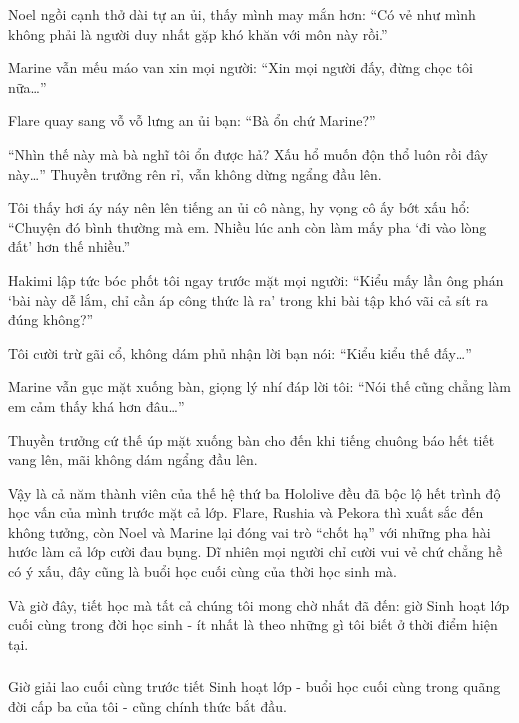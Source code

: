 \documentclass[../main.tex]{subfiles}
\begin{document}
Noel ngồi cạnh thở dài tự an ủi, thấy mình may mắn hơn: ``Có vẻ như mình không phải là người duy nhất gặp khó khăn với môn này rồi.''

Marine vẫn mếu máo van xin mọi người: ``Xin mọi người đấy, đừng chọc tôi nữa\dots''

Flare quay sang vỗ vỗ lưng an ủi bạn: ``Bà ổn chứ Marine?''

``Nhìn thế này mà bà nghĩ tôi ổn được hả? Xấu hổ muốn độn thổ luôn rồi đây này\dots'' Thuyền trưởng rên rỉ, vẫn không dừng ngẩng đầu lên.

Tôi thấy hơi áy náy nên lên tiếng an ủi cô nàng, hy vọng cô ấy bớt xấu hổ: ``Chuyện đó bình thường mà em. Nhiều lúc anh còn làm mấy pha `đi vào lòng đất' hơn thế nhiều.''

Hakimi lập tức bóc phốt tôi ngay trước mặt mọi người: ``Kiểu mấy lần ông phán `bài này dễ lắm, chỉ cần áp công thức là ra' trong khi bài tập khó vãi cả sít ra đúng không?''

Tôi cười trừ gãi cổ, không dám phủ nhận lời bạn nói: ``Kiểu kiểu thế đấy\dots''

Marine vẫn gục mặt xuống bàn, giọng lý nhí đáp lời tôi: ``Nói thế cũng chẳng làm em cảm thấy khá hơn đâu\dots''

Thuyền trưởng cứ thế úp mặt xuống bàn cho đến khi tiếng chuông báo hết tiết vang lên, mãi không dám ngẩng đầu lên.

Vậy là cả năm thành viên của thế hệ thứ ba Hololive đều đã bộc lộ hết trình độ học vấn của mình trước mặt cả lớp. Flare, Rushia và Pekora thì xuất sắc đến không tưởng, còn Noel và Marine lại đóng vai trò ``chốt hạ'' với những pha hài hước làm cả lớp cười đau bụng. Dĩ nhiên mọi người chỉ cười vui vẻ chứ chẳng hề có ý xấu, đây cũng là buổi học cuối cùng của thời học sinh mà.

Và giờ đây, tiết học mà tất cả chúng tôi mong chờ nhất đã đến: giờ Sinh hoạt lớp cuối cùng trong đời học sinh - ít nhất là theo những gì tôi biết ở thời điểm hiện tại.

\subsubsection*{\label{ep-C7.3}}

Giờ giải lao cuối cùng trước tiết Sinh hoạt lớp - buổi học cuối cùng trong quãng đời cấp ba của tôi - cũng chính thức bắt đầu.
\end{document}
